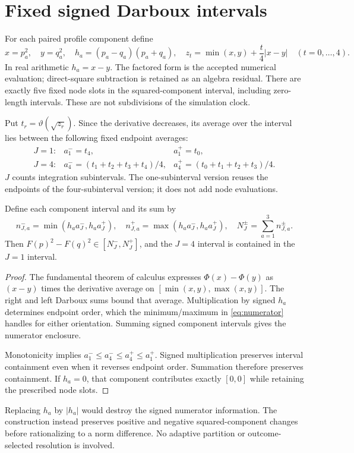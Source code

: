 \documentclass[11pt,a4paper]{article}
\begin{document}
\clearpage
\section{Fixed signed Darboux intervals}\label{sec:darboux}
For each paired profile component define
\begin{equation}\label{eq:xy}
x=p_a^2,\quad y=q_a^2,\quad h_a=(p_a-q_a)(p_a+q_a),\quad
z_t=\min(x,y)+\frac{t}{4}|x-y|\quad(t=0,\ldots,4).
\end{equation}
In real arithmetic $h_a=x-y$. The factored form is the accepted numerical evaluation; direct-square subtraction is retained as an algebra residual. There are exactly five fixed node slots in the squared-component interval, including zero-length intervals. These are not subdivisions of the simulation clock.

Put $t_r=\vartheta(\sqrt{z_r})$. Since the derivative decreases, its average over the interval lies between the following fixed endpoint averages:
\begin{equation}\label{eq:averages}
\begin{array}{lll}
J=1:& a_1^-=t_4,&a_1^+=t_0,\\[2mm]
J=4:& a_4^-=(t_1+t_2+t_3+t_4)/4,&a_4^+=(t_0+t_1+t_2+t_3)/4.
\end{array}
\end{equation}
$J$ counts integration subintervals. The one-subinterval version reuses the endpoints of the four-subinterval version; it does not add node evaluations.

\begin{proposition}\label{thm:numerator}
Define each component interval and its sum by
\begin{equation}\label{eq:numerator}
n_{J,a}^-=\min(h_aa_J^-,h_aa_J^+),\quad
n_{J,a}^+=\max(h_aa_J^-,h_aa_J^+),\quad N_J^\pm=\sum_{a=1}^3 n_{J,a}^\pm.
\end{equation}
Then $F(p)^2-F(q)^2\in[N_J^-,N_J^+]$, and the $J=4$ interval is contained in the $J=1$ interval.
\end{proposition}
\begin{proof}
The fundamental theorem of calculus expresses $\Phi(x)-\Phi(y)$ as $(x-y)$ times the derivative average on $[\min(x,y),\max(x,y)]$. The right and left Darboux sums bound that average. Multiplication by signed $h_a$ determines endpoint order, which the minimum/maximum in \eqref{eq:numerator} handles for either orientation. Summing signed component intervals gives the numerator enclosure.

Monotonicity implies $a_1^-\le a_4^-\le a_4^+\le a_1^+$. Signed multiplication preserves interval containment even when it reverses endpoint order. Summation therefore preserves containment. If $h_a=0$, that component contributes exactly $[0,0]$ while retaining the prescribed node slots.
\end{proof}
Replacing $h_a$ by $|h_a|$ would destroy the signed numerator information. The construction instead preserves positive and negative squared-component changes before rationalizing to a norm difference. No adaptive partition or outcome-selected resolution is involved.
\end{document}

